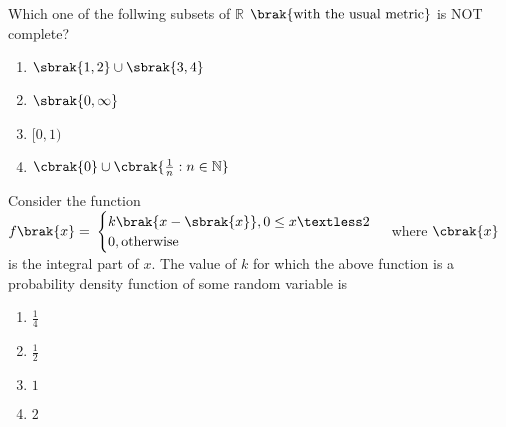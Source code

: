 \item{
Which one of the follwing subsets of $\mathbb{R}$ $\brak{\text{with the usual metric}}$ is NOT complete?
\begin{multicols}{4}
\begin{enumerate}
    \item $\sbrak{1,2}\cup\sbrak{3,4}$
    \item $\sbrak{0,\infty}$
    \item $[0,1)$
    \item $\cbrak{0}\cup\cbrak{\frac{1}{n}:n\in\mathbb{N}}$
\end{enumerate}
\end{multicols}
}
\item{
Consider the function\\
$f\brak{x}=$
$\begin{cases}
k\brak{x-\sbrak{x}}, 0\leq x\textless 2\\
0, \text{otherwise}
\end{cases}$
where $\cbrak{x}$ is the integral part of $x$. The value of $k$ for which the above function is a probability density function of some random variable is
\begin{multicols}{4}
\begin{enumerate}
    \item $\frac{1}{4}$
    \item $\frac{1}{2}$
    \item $1$
    \item $2$
\end{enumerate}
\end{multicols}
}
